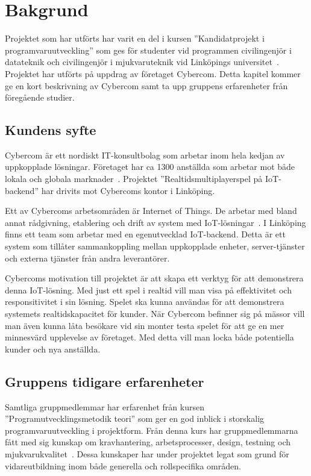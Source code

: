 \chapter{Bakgrund}
\label{cha:background}
Projektet som har utförts har varit en del i kursen ''Kandidatprojekt i programvaruutveckling'' som ges för studenter vid programmen civilingenjör i datateknik och civilingenjör i mjukvaruteknik vid Linköpings universitet~\cite{tddd96}. Projektet har utförts på uppdrag av företaget Cybercom. Detta kapitel kommer ge en kort beskrivning av Cybercom samt ta upp gruppens erfarenheter från föregående studier.

\section{Kundens syfte}
\label{sec:customer-aim}
Cybercom är ett nordiskt IT-konsultbolag som arbetar inom hela kedjan av uppkopplade lösningar. Företaget har ca 1300 anställda som arbetar mot både lokala och globala marknader~\cite{cybercomgroup}. Projektet ''Realtidsmultiplayerspel på IoT-backend'' har drivits mot Cybercoms kontor i Linköping.

Ett av Cybercoms arbetsområden är Internet of Things. De arbetar med bland annat rådgivning, etablering och drift av system med IoT-lösningar~\cite{cybercomiot}. I Linköping finns ett team som arbetar med en egenutvecklad IoT-backend. Detta är ett system som tillåter sammankoppling mellan uppkopplade enheter, server-tjänster och externa tjänster från andra leverantörer.

Cybercoms motivation till projektet är att skapa ett verktyg för att demonstrera denna IoT-lösning. Med just ett spel i realtid vill man visa på effektivitet och responsitivitet i sin lösning. Spelet ska kunna användas för att demonstrera systemets realtidskapacitet för kunder. När Cybercom befinner sig på mässor vill man även kunna låta besökare vid sin monter testa spelet för att ge en mer minnesvärd upplevelse av företaget. Med detta vill man locka både potentiella kunder och nya anställda.

\pagebreak

\section{Gruppens tidigare erfarenheter}
\label{sec:earlier-experience}
Samtliga gruppmedlemmar har erfarenhet från kursen ''Programutvecklingsmetodik teori'' som ger en god inblick i storskalig programvaruutveckling i projektform. Från denna kurs har gruppmedlemmarna fått med sig kunskap om kravhantering, arbetsprocesser, design, testning och mjukvarukvalitet~\cite{tddc93}. Dessa kunskaper har under projektet legat som grund för vidareutbildning inom både generella och rollspecifika områden.

